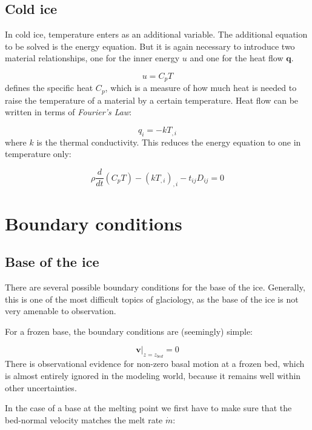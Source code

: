 \documentclass[12pt, openany]{memoir}
\begin{document}
\subsection{Cold ice}

In cold ice, temperature enters as an additional variable. The
additional equation to be solved is the energy equation. But it is
again necessary to introduce two material relationships, one for the
inner energy $u$ and one for the heat flow $\mathbf{q}$. 

\begin{equation}
u = C_p T
\end{equation}
defines the specific heat $C_p$, which is a measure of how much heat
is needed to raise the temperature of a material by a certain
temperature. Heat flow can be written in terms of \emph{Fourier's
  Law}:

\begin{equation}
q_i = -k T_{,i}
\end{equation}
where $k$ is the thermal conductivity. This reduces the energy
equation to one in temperature only: 

\begin{equation}
\rho \frac{d}{dt} (C_pT) - (k T_{,i})_{,i} - t_{ij}D_{ij} = 0
\end{equation}

\section{Boundary conditions}

\subsection{Base of the ice}

There are several possible boundary conditions for the base of
the ice. Generally, this is one of the most difficult topics of
glaciology, as the base of the ice is not very amenable to
observation.

For a frozen base, the boundary conditions are (seemingly) simple:

\begin{equation}
\mathbf{v}|_{z=z_{bed}} = 0
\end{equation}
There is observational evidence for non-zero basal motion at a frozen
bed, which is almost entirely ignored in the modeling world, because
it remains well within other uncertainties.

In the case of a base at the melting point we first have to make sure
that the bed-normal velocity matches the melt rate $\dot{m}$:
\end{document}
